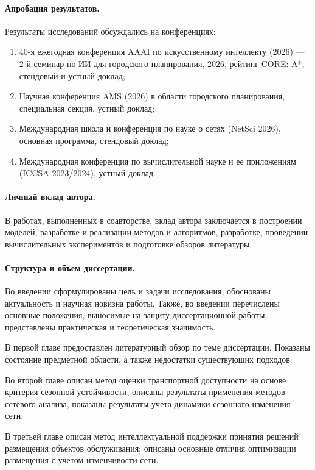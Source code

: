 \documentclass[14pt,a4paper]{extarticle}
\begin{document}
\paragraph*{Апробация результатов.}
Результаты исследований обсуждались на конференциях:
\begin{enumerate}
    \item 40-я ежегодная конференция AAAI по искусственному интеллекту (2026) --- 2-й семинар по ИИ для городского планирования, 2026, рейтинг CORE: A*, стендовый и устный доклад;
    \item Научная конференция AMS (2026) в области городского планирования, специальная секция, устный доклад;
    \item Международная школа и конференция по науке о сетях (NetSci 2026), основная программа, стендовый доклад;
    \item Международная конференция по вычислительной науке и ее приложениям (ICCSA 2023/2024), устный доклад.
\end{enumerate}

\paragraph*{Личный вклад автора.}
В работах, выполненных в соавторстве, вклад автора заключается в построении моделей, разработке и реализации методов и алгоритмов, разработке, проведении вычислительных экспериментов и подготовке обзоров литературы.

\paragraph*{Структура и объем диссертации.}
Во введении сформулированы цель и задачи исследования, обоснованы актуальность и научная новизна работы. Также, во введении перечислены основные положения, выносимые на защиту диссертационной работы; представлены практическая и теоретическая значимость.

В первой главе предоставлен литературный обзор по теме диссертации. Показаны состояние предметной области, а также недостатки существующих подходов.

Во второй главе описан метод оценки транспортной доступности на основе критерия сезонной устойчивости, описаны результаты применения методов сетевого анализа, показаны результаты учета динамики сезонного изменения сети.

В третьей главе описан метод интеллектуальной поддержки принятия решений размещения объектов обслуживания; описаны основные отличия оптимизации размещения с учетом изменчивости сети.
\end{document}
